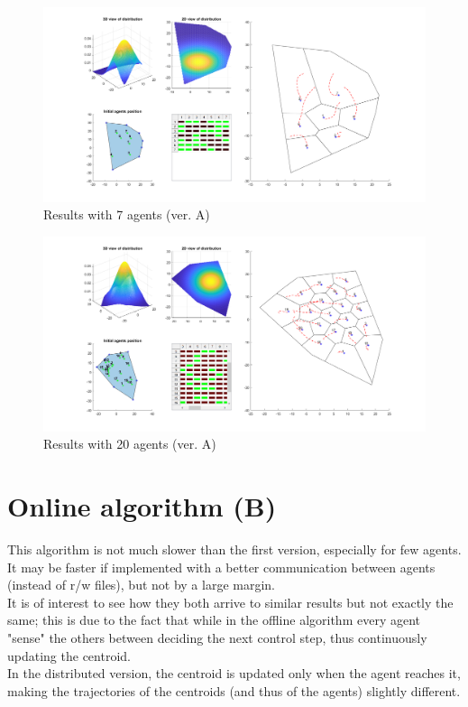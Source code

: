 \documentclass[a4paper,11pt,oneside]{book}
\begin{document}
	
	\begin{figure}	
		\centering	
		\includegraphics[scale=0.45,angle=90]{figs/convergenceResultsA.png}
		\caption{Results with 7 agents (ver. A)}\label{fig:convergenceResultsA.png}	
	\end{figure}
	
	\begin{figure}	
		\centering	
		\includegraphics[scale=0.45, angle=90]{figs/20convergenceResultsA.png}
		\caption{Results with 20 agents (ver. A)}\label{fig:20convergenceResultsA.png}	
	\end{figure}
	
	\section{Online algorithm (B)}
	This algorithm is not much slower than the first version, especially for few agents.\\
	It may be faster if implemented with a better communication between agents (instead of r/w files), but not by a large margin.\\
	
	It is of interest to see how they both arrive to similar results but not exactly the same; this is due to the fact that while in the offline algorithm every agent "sense" the others between deciding the next control step, thus continuously updating the centroid.\\
	In the distributed version, the centroid is updated only when the agent reaches it, making the trajectories of the centroids (and thus of the agents) slightly different.
	
\end{document}
